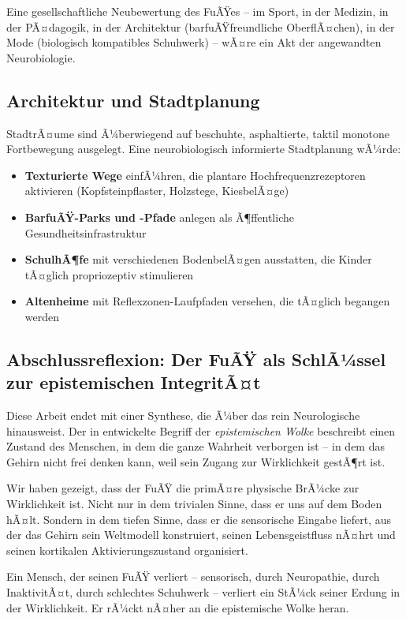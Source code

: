 ﻿\documentclass[12pt,a4paper]{report}
\theoremstyle{plain}
\theoremstyle{definition}
\theoremstyle{remark}
\begin{document}
Eine gesellschaftliche Neubewertung des FuÃŸes -- im Sport,
in der Medizin, in der PÃ¤dagogik, in der Architektur
(barfuÃŸfreundliche OberflÃ¤chen), in der Mode (biologisch
kompatibles Schuhwerk) -- wÃ¤re ein Akt der angewandten
Neurobiologie.

\subsection{Architektur und Stadtplanung}

StadtrÃ¤ume sind Ã¼berwiegend auf beschuhte, asphaltierte,
taktil monotone Fortbewegung ausgelegt. Eine neurobiologisch
informierte Stadtplanung wÃ¼rde:

\begin{itemize}
\item \textbf{Texturierte Wege} einfÃ¼hren, die plantare
  Hochfrequenzrezeptoren aktivieren (Kopfsteinpflaster,
  Holzstege, KiesbelÃ¤ge)
\item \textbf{BarfuÃŸ-Parks und -Pfade} anlegen als
  Ã¶ffentliche Gesundheitsinfrastruktur
\item \textbf{SchulhÃ¶fe} mit verschiedenen BodenbelÃ¤gen
  ausstatten, die Kinder tÃ¤glich propriozeptiv stimulieren
\item \textbf{Altenheime} mit Reflexzonen-Laufpfaden versehen,
  die tÃ¤glich begangen werden
\end{itemize}

\subsection{Abschlussreflexion: Der FuÃŸ als SchlÃ¼ssel zur epistemischen IntegritÃ¤t}

Diese Arbeit endet mit einer Synthese, die Ã¼ber das rein
Neurologische hinausweist. Der in \cite{epp2026brn} entwickelte
Begriff der \emph{epistemischen Wolke} beschreibt einen Zustand
des Menschen, in dem die ganze Wahrheit verborgen ist -- in dem
das Gehirn nicht frei denken kann, weil sein Zugang zur
Wirklichkeit gestÃ¶rt ist.

Wir haben gezeigt, dass der FuÃŸ die primÃ¤re physische BrÃ¼cke
zur Wirklichkeit ist. Nicht nur in dem trivialen Sinne, dass
er uns auf dem Boden hÃ¤lt. Sondern in dem tiefen Sinne, dass er
die sensorische Eingabe liefert, aus der das Gehirn sein Weltmodell
konstruiert, seinen Lebensgeistfluss nÃ¤hrt und seinen kortikalen
Aktivierungszustand organisiert.

Ein Mensch, der seinen FuÃŸ verliert -- sensorisch, durch
Neuropathie, durch InaktivitÃ¤t, durch schlechtes Schuhwerk --
verliert ein StÃ¼ck seiner Erdung in der Wirklichkeit. Er rÃ¼ckt
nÃ¤her an die epistemische Wolke heran.
\end{document}
